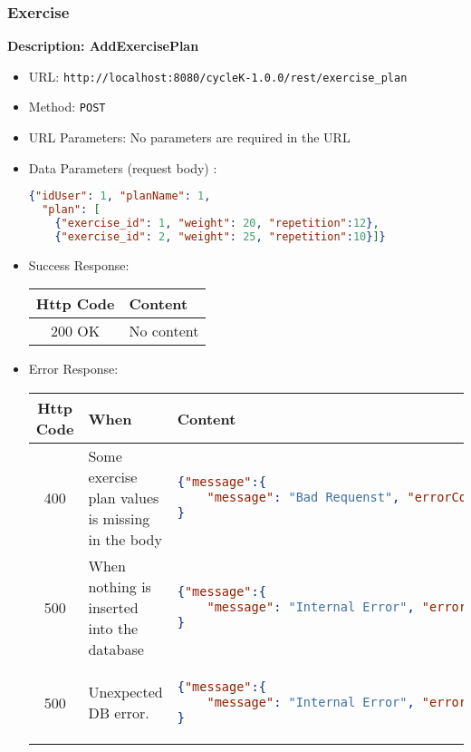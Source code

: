 \subsubsection*{Exercise}
\textbf{Description: AddExercisePlan}
\begin{itemize}
    \item URL: \texttt{http://localhost:8080/cycleK-1.0.0/rest/exercise\_plan}
    \item Method: \texttt{POST}
    \item URL Parameters: No parameters are required in the URL
    \item Data Parameters (request body) : 
    \begin{lstlisting}[language=json,firstnumber=1]
 {"idUser": 1, "planName": 1, 
  "plan": [
    {"exercise_id": 1, "weight": 20, "repetition":12},
    {"exercise_id": 2, "weight": 25, "repetition":10}]}
\end{lstlisting}
\item Success Response:
\begin{longtable}{|c|p{13.5cm}|}
\hline
\textbf{Http Code} & \textbf{Content} \\\hline
200 OK & No content \\\hline
\end{longtable}

\item Error Response:
\begin{longtable}{|c|p{4cm}|p{9cm}|}
\hline
\textbf{Http Code} & \textbf{When} & \textbf{Content} \\\hline
400 &  Some exercise plan values is missing in the body &
\begin{lstlisting}[language=json,firstnumber=1]
{"message":{
    "message": "Bad Requenst", "errorCode": "-604", "errorDetails": "No JSON object found in the request", "error": true}
}
\end{lstlisting}\\\hline
500 & When nothing is inserted into the database & 
\begin{lstlisting}[language=json,firstnumber=1]
{"message":{
    "message": "Internal Error", "errorCode": "-615", "errorDetails": "failed to insert plan into db", "error": true}
}
\end{lstlisting}\\\hline
500 & Unexpected DB error. & 
\begin{lstlisting}[language=json,firstnumber=1]
{"message":{
    "message": "Internal Error", "errorCode": "-605", "errorDetails": "Unexpected Error while adding exercise plan", "error": true}
}
\end{lstlisting}\\\hline
\end{longtable}    
\end{itemize}
\newpage
